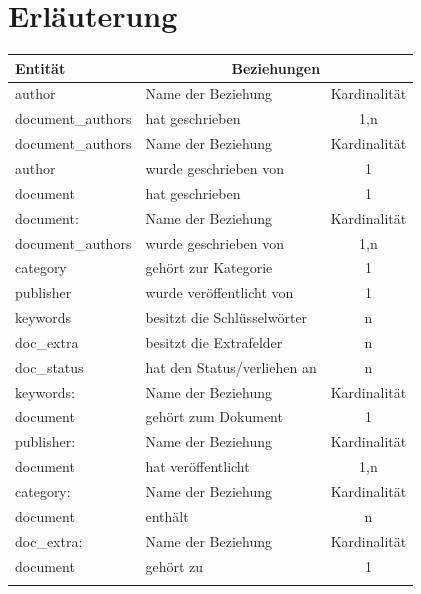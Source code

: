 \section{Erl\"auterung}

\begin{longtable}{|p{5cm}||m{5cm}|c|}
  \hline
  Entit\"at & \multicolumn{2}{c|}{Beziehungen} \\
  \hline\hline\hline
  
  author  & Name der Beziehung &  Kardinalit\"at\\
  \hline\hline
  document\_authors & hat geschrieben & 1,n \\
  \hline\hline\hline
  
  document\_authors & Name der Beziehung & Kardinalität\\
  \hline\hline
  author & wurde geschrieben von & 1\\
  \hline
  document & hat geschrieben & 1\\
  \hline\hline\hline
  
  document: & Name der Beziehung & Kardinalität\\
  \hline\hline
  document\_authors & wurde geschrieben von & 1,n\\
  \hline
  category & gehört zur Kategorie & 1\\
  \hline
  publisher & wurde veröffentlicht von & 1\\
  \hline
  keywords & besitzt die Schlüsselwörter & n\\  
  \hline
  doc\_extra & besitzt die Extrafelder & n\\
  \hline
  doc\_status & hat den Status/verliehen an & n\\
  \hline\hline\hline
  
  keywords:  & Name der Beziehung &  Kardinalit\"at\\
  \hline\hline
  document & gehört zum Dokument & 1 \\
  \hline\hline\hline
  
  publisher:  & Name der Beziehung &  Kardinalit\"at\\
  \hline\hline
  document & hat veröffentlicht & 1,n \\
  \hline\hline\hline
  
  category:  & Name der Beziehung &  Kardinalit\"at\\
  \hline\hline
  document & enthält & n \\
  \hline\hline\hline
  
  doc\_extra:  & Name der Beziehung &  Kardinalit\"at\\
  \hline\hline
  document & gehört zu & 1 \\
  \hline
  \pagebreak
  \hline\hline
  

\end{longtable}
